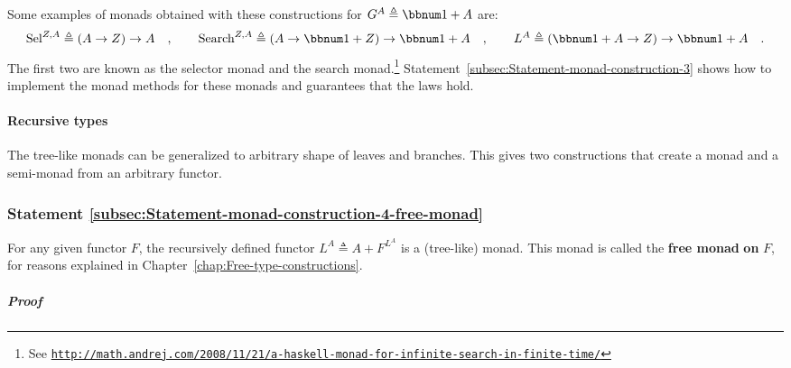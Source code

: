 Some examples of monads obtained with these constructions for $G^{A}\triangleq\bbnum 1+A$
are:
\[
\text{Sel}^{Z,A}\triangleq\left(A\rightarrow Z\right)\rightarrow A\quad,\quad\quad\text{Search}^{Z,A}\triangleq\left(A\rightarrow\bbnum 1+Z\right)\rightarrow\bbnum 1+A\quad,\quad\quad L^{A}\triangleq\left(\bbnum 1+A\rightarrow Z\right)\rightarrow\bbnum 1+A\quad.
\]
The first two are known as the selector monad
and the search monad.\footnote{See \texttt{\href{http://math.andrej.com/2008/11/21/a-haskell-monad-for-infinite-search-in-finite-time/}{http://math.andrej.com/2008/11/21/a-haskell-monad-for-infinite-search-in-finite-time/}}}
Statement~\ref{subsec:Statement-monad-construction-3} shows how
to implement the monad methods for these monads and guarantees that
the laws hold.

\paragraph{Recursive types}

The tree-like monads can be generalized to arbitrary shape of leaves
and branches. This gives two constructions that create a monad and
a semi-monad from an arbitrary functor.

\subsubsection{Statement \label{subsec:Statement-monad-construction-4-free-monad}\ref{subsec:Statement-monad-construction-4-free-monad}}

For any given functor $F$, the recursively defined functor $L^{A}\triangleq A+F^{L^{A}}$
is a (tree-like) monad. This monad is called the \textbf{free monad}\textbf{
on} $F$, for reasons explained in Chapter~\ref{chap:Free-type-constructions}.

\subparagraph{Proof}

